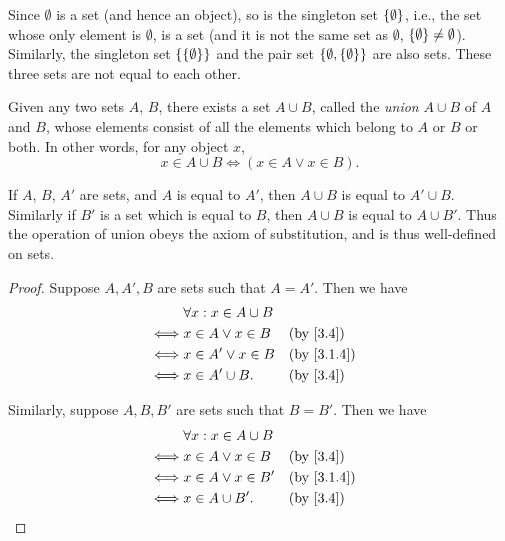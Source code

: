 \begin{eg}\label{3.1.10}
  Since \(\emptyset\) is a set (and hence an object), so is the singleton set \(\left\lbrace\emptyset\right\rbrace\), i.e., the set whose only element is \(\emptyset\), is a set (and it is not the same set as \(\emptyset\), \(\left\lbrace\emptyset\right\rbrace \neq \emptyset\)).
  Similarly, the singleton set \(\left\lbrace\left\lbrace\emptyset\right\rbrace\right\rbrace\) and the pair set \(\left\lbrace\emptyset, \left\lbrace\emptyset\right\rbrace\right\rbrace\) are also sets.
  These three sets are not equal to each other.
\end{eg}

\begin{ax}\label{3.4}
  Given any two sets \(A\), \(B\), there exists a set \(A \cup B\), called the \emph{union} \(A \cup B\) of \(A\) and \(B\), whose elements consist of all the elements which belong to \(A\) or \(B\) or both.
  In other words, for any object \(x\),
  \[
    x \in A \cup B \iff (x \in A \lor x \in B).
  \]
\end{ax}

\setcounter{thm}{11}
\begin{rmk}\label{3.1.12}
  If \(A\), \(B\), \(A'\) are sets, and \(A\) is equal to \(A'\), then \(A \cup B\) is equal to \(A' \cup B\).
  Similarly if \(B'\) is a set which is equal to \(B\), then \(A \cup B\) is equal to \(A \cup B'\).
  Thus the operation of union obeys the axiom of substitution, and is thus well-defined on sets.
\end{rmk}

\begin{proof}
  Suppose \(A, A', B\) are sets such that \(A = A'\).
  Then we have
  \begin{align*}
         & \forall x : x \in A \cup B                 \\
    \iff & x \in A \lor x \in B       &  & \by{3.4}   \\
    \iff & x \in A' \lor x \in B      &  & \by{3.1.4} \\
    \iff & x \in A' \cup B.           &  & \by{3.4}
  \end{align*}

  Similarly, suppose \(A, B, B'\) are sets such that \(B = B'\).
  Then we have
  \begin{align*}
         & \forall x : x \in A \cup B                 \\
    \iff & x \in A \lor x \in B       &  & \by{3.4}   \\
    \iff & x \in A \lor x \in B'      &  & \by{3.1.4} \\
    \iff & x \in A \cup B'.           &  & \by{3.4}
  \end{align*}
\end{proof}

